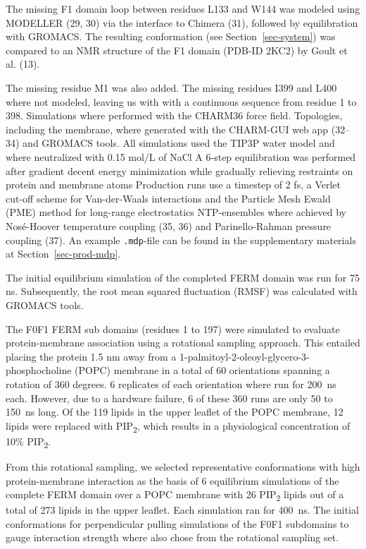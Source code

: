 \documentclass[
  letterpaper,
  DIV=11,
  numbers=noendperiod]{scrartcl}
\begin{document}
The missing F1 domain loop between residues L133 and W144 was modeled
using MODELLER (29, 30) via the interface to Chimera (31), followed by
equilibration with GROMACS. The resulting conformation (see
Section~\ref{sec-system}) was compared to an NMR structure of the F1
domain (PDB-ID 2KC2) by Goult et al. (13).

The missing residue M1 was also added. The missing residues I399 and
L400 where not modeled, leaving us with with a continuous sequence from
residue 1 to 398. Simulations where performed with the CHARM36 force
field. Topologies, including the membrane, where generated with the
CHARM-GUI web app (32--34) and GROMACS tools. All simulations used the
TIP3P water model and where neutralized with 0.15 mol/L of NaCl A 6-step
equilibration was performed after gradient decent energy minimization
while gradually relieving restraints on protein and membrane atoms
Production runs use a timestep of 2 fs, a Verlet cut-off scheme for
Van-der-Waals interactions and the Particle Mesh Ewald (PME) method for
long-range electrostatics NTP-ensembles where achieved by Nosé-Hoover
temperature coupling (35, 36) and Parinello-Rahman pressure coupling
(37). An example \texttt{.mdp}-file can be found in the supplementary
materials at Section~\ref{sec-prod-mdp}.

The initial equilibrium simulation of the completed FERM domain was run
for 75 ns. Subsequently, the root mean squared fluctuation (RMSF) was
calculated with GROMACS tools.

The F0F1 FERM sub domains (residues 1 to 197) were simulated to evaluate
protein-membrane association using a rotational sampling approach. This
entailed placing the protein 1.5 nm away from a
1-palmitoyl-2-oleoyl-glycero-3-phosphocholine (POPC) membrane in a total
of 60 orientations spanning a rotation of 360 degrees. 6 replicates of
each orientation where run for 200~ns each. However, due to a hardware
failure, 6 of these 360 runs are only 50 to 150~ns long. Of the 119
lipids in the upper leaflet of the POPC membrane, 12 lipids were
replaced with PIP\textsubscript{2}, which results in a physiological
concentration of 10\% PIP\textsubscript{2}.

From this rotational sampling, we selected representative conformations
with high protein-membrane interaction as the basis of 6 equilibrium
simulations of the complete FERM domain over a POPC membrane with 26
PIP\textsubscript{2} lipids out of a total of 273 lipids in the upper
leaflet. Each simulation ran for 400~ns. The initial conformations for
perpendicular pulling simulations of the F0F1 subdomains to gauge
interaction strength where also chose from the rotational sampling set.
\end{document}

